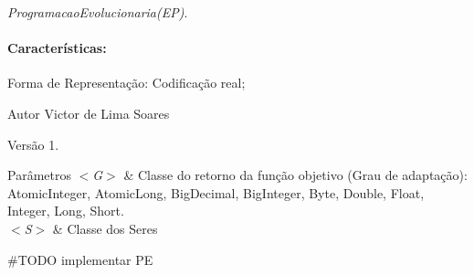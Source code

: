 {\itshape Programacao\-Evolucionaria(\-E\-P)}. \par
 \paragraph*{Características\-:}


\begin{DoxyItemize}
\item Forma de Representação\-: Codificação real; 
\end{DoxyItemize}

\begin{DoxyAuthor}{Autor}
Victor de Lima Soares 
\end{DoxyAuthor}
\begin{DoxyVersion}{Versão}
1. 
\end{DoxyVersion}

\begin{DoxyParams}{Parâmetros}
{\em $<$\-G$>$} & Classe do retorno da função objetivo (Grau de adaptação)\-: Atomic\-Integer, Atomic\-Long, Big\-Decimal, Big\-Integer, Byte, Double, Float, Integer, Long, Short. \\
\hline
{\em $<$\-S$>$} & Classe dos Seres\\
\hline
\end{DoxyParams}
\#\-T\-O\-D\-O implementar P\-E 


